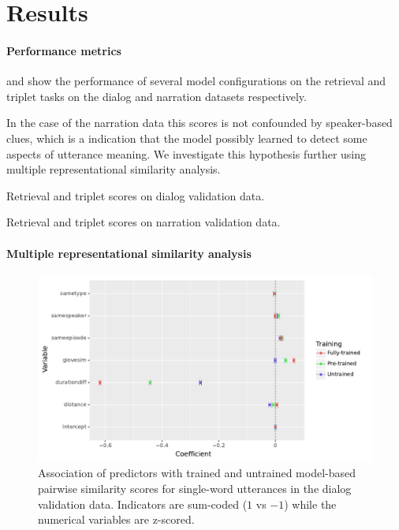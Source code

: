 \section{Results}
\label{sec:results}
\paragraph{Performance metrics}
 and  show
the performance of several model configurations on the retrieval and
triplet tasks on the dialog and narration datasets respectively.

In the case of the narration data this scores is not confounded by
speaker-based clues, which is a indication that the model possibly
learned to detect some aspects of utterance meaning. We investigate
this hypothesis further using multiple representational similarity
analysis.
 

 \begin{table}
   \centering
   
   \caption{Retrieval and triplet scores on dialog validation data.}
   \label{tab:scores-dialog}
 \end{table}

\begin{table}
   \centering
   
   \caption{Retrieval and triplet scores on narration validation data.}
   \label{tab:scores-narration}
 \end{table}
 
 
\paragraph{Multiple representational similarity analysis}

\begin{figure}
  \centering
  \includegraphics[scale=0.66]{results/grsa_dialog_coef.pdf}
  \caption{Association of predictors with trained and untrained
    model-based pairwise similarity scores for single-word utterances
    in the dialog validation data. Indicators are sum-coded ($1$ vs
    $-1$) while the numerical variables are z-scored.}
  \label{fig:coef_dialog}
\end{figure}

